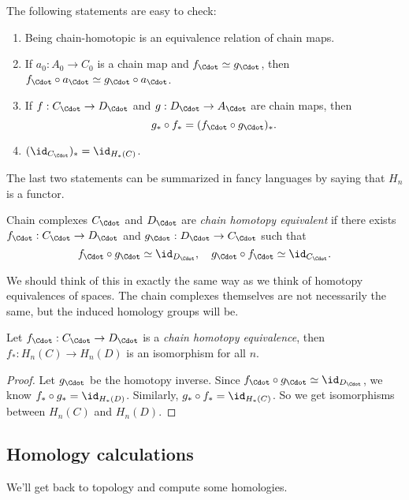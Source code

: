 \documentclass[a4paper]{article}
\begin{document}
The following statements are easy to check:
\begin{prop}\leavevmode
  \begin{enumerate}
    \item Being chain-homotopic is an equivalence relation of chain maps.
    \item If $a_0: A_0 \to C_0$ is a chain map and $f_{\Cdot} \simeq g_{\Cdot}$, then $f_{\Cdot} \circ a_{\Cdot} \simeq g_{\Cdot} \circ a_{\Cdot}$.
    \item If $f: C_{\Cdot} \to D_{\Cdot}$ and $g: D_{\Cdot} \to A_{\Cdot}$ are chain maps, then
      \[
        g_* \circ f_* = (f_{\Cdot} \circ g_{\Cdot})_*.
      \]
    \item $(\id_{C_{\Cdot}})_* = \id_{H_*(C)}$.
  \end{enumerate}
\end{prop}
The last two statements can be summarized in fancy languages by saying that $H_n$ is a functor.

\begin{defi}
  Chain complexes $C_{\Cdot}$ and $D_{\Cdot}$ are \emph{chain homotopy equivalent} if there exists $f_{\Cdot}: C_{\Cdot} \to D_{\Cdot}$ and $g_{\Cdot}: D_{\Cdot}\to C_{\Cdot}$ such that
  \[
    f_{\Cdot} \circ g_{\Cdot} \simeq \id_{D_{\Cdot}},\quad g_{\Cdot} \circ f_{\Cdot}\simeq \id_{C_{\Cdot}}.
  \]
\end{defi}
We should think of this in exactly the same way as we think of homotopy equivalences of spaces. The chain complexes themselves are not necessarily the same, but the induced homology groups will be.

\begin{lemma}
  Let $f_{\Cdot}: C_{\Cdot} \to D_{\Cdot}$ is a \emph{chain homotopy equivalence}, then $f_*: H_n(C) \to H_n(D)$ is an isomorphism for all $n$.
\end{lemma}

\begin{proof}
  Let $g_{\Cdot}$ be the homotopy inverse. Since $f_{\Cdot} \circ g_{\Cdot} \simeq \id_{D_{\Cdot}}$, we know $f_* \circ g_* = \id_{H_*(D)}$. Similarly, $g_* \circ f_* = \id_{H_*(C)}$. So we get isomorphisms between $H_n(C)$ and $H_n(D)$.
\end{proof}

\subsection{Homology calculations}
We'll get back to topology and compute some homologies.
\end{document}
